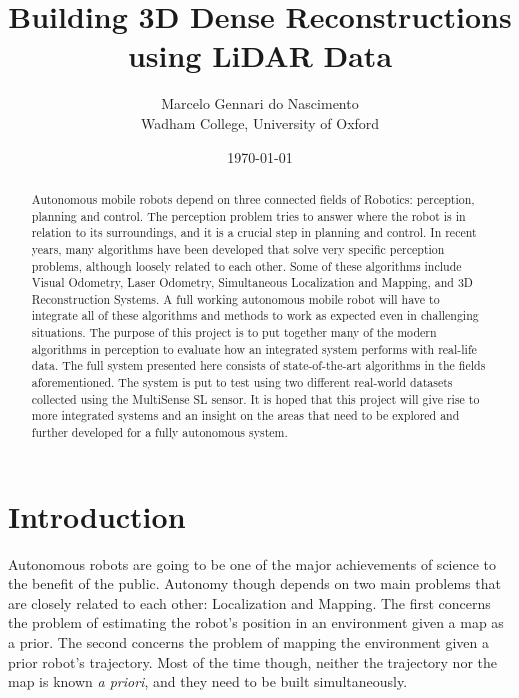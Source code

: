 \documentclass[11pt]{article}
\title{Building 3D Dense Reconstructions using LiDAR Data}
\author{Marcelo Gennari do Nascimento \\ Wadham College, University of Oxford}
\date{\today}
\begin{document}

	\maketitle

	\newpage

	\begin{abstract}
		Autonomous mobile robots depend on three connected fields of Robotics: perception, planning and control. The perception problem tries to answer where the robot is in relation to its surroundings, and it is a crucial step in planning and control.
		In recent years, many algorithms have been developed that solve very specific perception problems, although loosely related to each other. Some of these algorithms include Visual Odometry, Laser Odometry, Simultaneous Localization and Mapping, and 3D Reconstruction Systems.
		A full working autonomous mobile robot will have to integrate all of these algorithms and methods to work as expected even in challenging situations.
		The purpose of this project is to put together many of the modern algorithms in perception to evaluate how an integrated system performs with real-life data. The full system presented here consists of state-of-the-art algorithms in the fields aforementioned. The system is put to test using two different real-world datasets collected using the MultiSense SL sensor.
		It is hoped that this project will give rise to more integrated systems and an insight on the areas that need to be explored and further developed for a fully autonomous system.
	\end{abstract}

	\newpage
	\tableofcontents

	\newpage

	\section{Introduction}

Autonomous robots are going to be one of the major achievements of science to the benefit of the public. Autonomy though depends on two main problems that are closely related to each other: Localization and Mapping. The first concerns the problem of estimating the robot's position in an environment given a map as a prior. The second concerns the problem of mapping the environment given a prior robot's trajectory. Most of the time though, neither the trajectory nor the map is known \textit{a priori}, and they need to be built simultaneously. 
\end{document}
